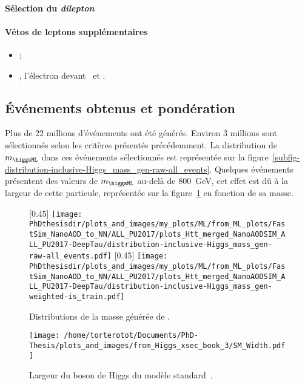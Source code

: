 \paragraph{Sélection du \emph{dilepton}}
\AtLeastOneOSPair{\ele\ele}
\IfMoreOnePair
\paragraph{Vétos de leptons supplémentaires}
\LeptonVetoes
\begin{itemize}
    \item \LeptonVetoesSecondMuon;
    \item \LeptonVetoesSecondEle, l'électron devant \PassConversionVeto\ et \LessTwoMissingHitsVertex.
\end{itemize}
\subsection{Événements obtenus et pondération}
Plus de 22 millions d'événements ont été générés.
Environ 3 millions sont sélectionnés selon les critères présentés précédemment.
La distribution de $m_{\higgsML}$ dans ces événements sélectionnés est représentée sur la figure~\ref{subfig-distribution-inclusive-Higgs_mass_gen-raw-all_events}.
Quelques événements présentent des valeurs de $m_{\higgsML}$ au-delà de \SI{800}{\GeV}, cet effet est dû à la largeur de cette particule,
représentée sur la figure~\ref{fig-_Higgs_xsec_book_3-SM_Width} en fonction de sa masse.
\begin{figure}[b]
\centering

[0.45\textwidth]
{\texttt{[image: \\PhDthesisdir/plots\_and\_images/my\_plots/ML/from\_ML\_plots/FastSim\_NanoAOD\_to\_NN/ALL\_PU2017/plots\_Htt\_merged\_NanoAODSIM\_ALL\_PU2017-DeepTau/distribution-inclusive-Higgs\_mass\_gen-raw-all\_events.pdf]}}
\hfill
{}[0.45\textwidth]
{\texttt{[image: \\PhDthesisdir/plots\_and\_images/my\_plots/ML/from\_ML\_plots/FastSim\_NanoAOD\_to\_NN/ALL\_PU2017/plots\_Htt\_merged\_NanoAODSIM\_ALL\_PU2017-DeepTau/distribution-inclusive-Higgs\_mass\_gen-weighted-is\_train.pdf]}}

\caption[Distributions de la masse générée de \higgsML.]{Distributions de la masse générée de \higgsML.}
\label{fig-distribution-inclusive-Higgs_mass_gen-raw-all_events}

\vspace{\baselineskip}

\texttt{[image: /home/torterotot/Documents/PhD-Thesis/plots\_and\_images/from\_Higgs\_xsec\_book\_3/SM\_Width.pdf]}
\caption[Largeur du boson de Higgs du modèle standard.]{Largeur du boson de Higgs du modèle standard~\cite{Higgs_xsec_book_3}.}
\label{fig-_Higgs_xsec_book_3-SM_Width}
\end{figure}

